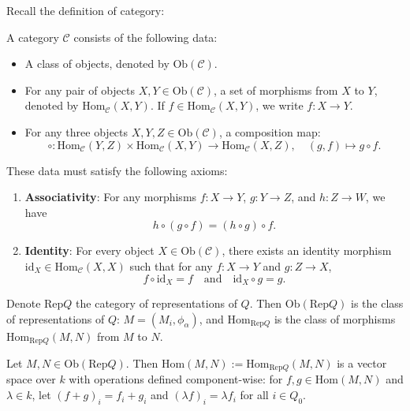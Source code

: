 \documentclass[11pt, a4paper]{report}
\begin{document}
Recall the definition of category:

\begin{definition} 
A category $\mathcal{C}$ consists of the following data:
\begin{itemize}
    \item A class of objects, denoted by $\mathrm{Ob}(\mathcal{C})$.
    \item For any pair of objects $X, Y \in \mathrm{Ob}(\mathcal{C})$, a set of morphisms from $X$ to $Y$, denoted by $\mathrm{Hom}_{\mathcal{C}}(X, Y)$. If $f \in \mathrm{Hom}_{\mathcal{C}}(X, Y)$, we write $f: X \to Y$.
    \item For any three objects $X, Y, Z \in \mathrm{Ob}(\mathcal{C})$, a composition map:
    \[
    \circ: \mathrm{Hom}_{\mathcal{C}}(Y, Z) \times \mathrm{Hom}_{\mathcal{C}}(X, Y) \to \mathrm{Hom}_{\mathcal{C}}(X, Z), \quad (g, f) \mapsto g \circ f.
    \]
\end{itemize}
These data must satisfy the following axioms:
\begin{enumerate}
    \item \textbf{Associativity}: For any morphisms $f: X \to Y$, $g: Y \to Z$, and $h: Z \to W$, we have
    \[
    h \circ (g \circ f) = (h \circ g) \circ f.
    \]
    \item \textbf{Identity}: For every object $X \in \mathrm{Ob}(\mathcal{C})$, there exists an identity morphism $\mathrm{id}_X \in \mathrm{Hom}_{\mathcal{C}}(X, X)$ such that for any $f: X \to Y$ and $g: Z \to X$,
    \[
    f \circ \mathrm{id}_X = f \quad \text{and} \quad \mathrm{id}_X \circ g = g.
    \]
\end{enumerate}
\end{definition}

Denote $ \mathrm{Rep}Q $ the category of representations of $ Q $. Then $ \mathrm{Ob}(\mathrm{Rep}Q) $ is the class of representations of $ Q $: $M=(M_i, \phi_{\alpha})$, and $ \mathrm{Hom}_{\mathrm{Rep}Q} $ is the class of morphisms $  \mathrm{Hom}_{\mathrm{Rep}Q}(M,N) $ from $ M $ to $ N $.

Let $ M,N \in \mathrm{Ob}(\mathrm{Rep}Q) $. Then $ \mathrm{Hom}(M,N):= \mathrm{Hom}_{\mathrm{Rep}Q}(M,N) $ is a vector space over $k$ with operations defined component-wise: for $ f,g \in \mathrm{Hom}(M,N) $ and $ \lambda \in k $, let $(f+g)_i = f_i + g_i$ and $(\lambda f)_i = \lambda f_i$ for all $ i \in Q_0 $.
\end{document}
